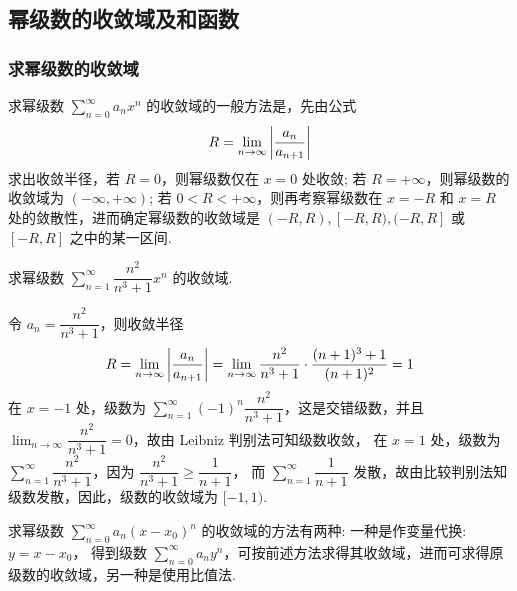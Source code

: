 \subsection{幂级数的收敛域及和函数}

\subsubsection{求幂级数的收敛域}

求幂级数 $\displaystyle\sum_{n=0}^{\infty}a_nx^n$ 的收敛域的一般方法是，先由公式
$$R=\lim_{n\to\infty}\qty|\dfrac{a_n}{a_{n+1}}|$$
求出收敛半径，若 $R=0$，则幂级数仅在 $x=0$ 处收敛; 若 $R=+\infty$，则幂级数的收敛域为 $(-\infty,+\infty)$;
若 $0<R<+\infty$，则再考察幂级数在 $x=-R$ 和 $x=R$ 处的敛散性，进而确定幂级数的收敛域是 $(-R,R),[-R,R),(-R,R]$ 或 $[-R,R]$ 之中的某一区间.

\begin{example}
    求幂级数 $\displaystyle\sum_{n=1}^{\infty}\dfrac{n^2}{n^3+1}x^n$ 的收敛域.
\end{example}
\begin{solution}
    令 $a_n=\dfrac{n^2}{n^3+1}$，则收敛半径
    $$R=\displaystyle\lim_{n\to\infty}\qty|\dfrac{a_n}{a_{n+1}}|=\lim_{n\to\infty}\dfrac{n^2}{n^3+1}\cdot\dfrac{(n+1)^3+1}{(n+1)^2}=1$$
    在 $x=-1$ 处，级数为 $\displaystyle\sum_{n=1}^{\infty}(-1)^n\dfrac{n^2}{n^3+1}$，这是交错级数，并且 $\displaystyle\lim_{n\to\infty}\dfrac{n^2}{n^3+1}=0$，故由 Leibniz 判别法可知级数收敛，
    在 $x=1$ 处，级数为 $\displaystyle\sum_{n=1}^{\infty}\dfrac{n^2}{n^3+1}$，因为 $\dfrac{n^2}{n^3+1}\geqslant \dfrac{1}{n+1}$，
    而 $\displaystyle\sum_{n=1}^{\infty}\dfrac{1}{n+1}$ 发散，故由比较判别法知级数发散，因此，级数的收敛域为 $[-1,1).$
\end{solution}

求幂级数 $\displaystyle\sum_{n=0}^{\infty}a_n(x-x_0)^n$ 的收敛域的方法有两种: 一种是作变量代换: $y=x-x_0$，
得到级数 $\displaystyle\sum_{n=0}^{\infty}a_ny^n$，可按前述方法求得其收敛域，进而可求得原级数的收敛域，另一种是使用比值法.

